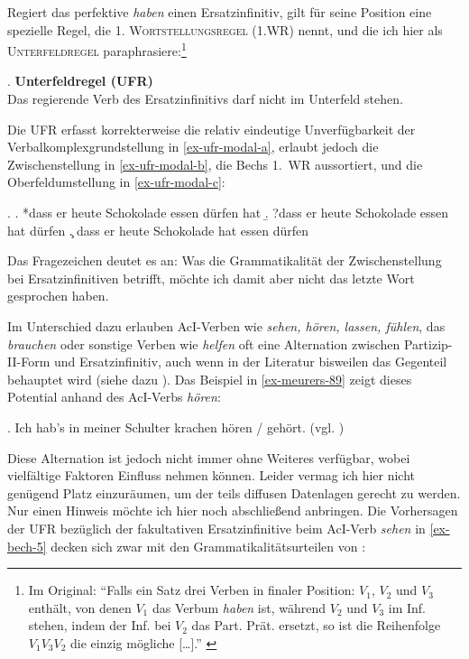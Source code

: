 Regiert das perfektive {\it haben} einen Ersatzinfinitiv, gilt für seine Position eine spezielle Regel, die \cite{Bech:63}  \textsc{1. Wortstellungsregel (1.WR)} nennt, und die ich hier als \textsc{Unterfeldregel} paraphrasiere:\footnote{Im Original: "`Falls ein Satz drei Verben in finaler Position: $V_1$, $V_2$ und $V_3$ enthält, von denen $V_1$ das Verbum {\it haben} ist, während $V_2$ und $V_3$ im Inf. stehen, indem der Inf. bei $V_2$ das Part. Prät. ersetzt, so ist die Reihenfolge $V_1 V_3 V_2$ die einzig mögliche [\ldots]."' \cite[\S 10]{Bech:63}} 

\ex. {\bf Unterfeldregel (UFR)} \label{ex-ufr}\\
Das regierende Verb des Ersatzinfinitivs darf nicht im Unterfeld stehen.

Die UFR erfasst korrekterweise die relativ eindeutige Unverfügbarkeit der Verbalkomplexgrundstellung in \ref{ex-ufr-modal-a}, erlaubt jedoch die Zwischenstellung in \ref{ex-ufr-modal-b}, die Bechs 1.~WR aussortiert, und die Oberfeldumstellung in \ref{ex-ufr-modal-c}:

\ex. 
\a. *dass er heute Schokolade essen dürfen hat \label{ex-ufr-modal-a}
\b. ?dass er heute Schokolade essen hat dürfen \label{ex-ufr-modal-b}
\c. dass er heute Schokolade hat essen dürfen \label{ex-ufr-modal-c}

Das Fragezeichen deutet es an: Was die Grammatikalität der Zwischenstellung bei Ersatzinfinitiven betrifft, möchte ich damit aber nicht das letzte Wort gesprochen haben.

Im Unterschied dazu erlauben AcI-Verben wie {\it sehen, hören, lassen, fühlen}, das  {\it brauchen} oder sonstige Verben wie {\it helfen} oft eine Alternation zwischen Partizip-II-Form und Ersatzinfinitiv, auch wenn in der Literatur bisweilen das Gegenteil behauptet wird (siehe dazu \citealt[55ff]{Meurers:99}). Das Beispiel in \ref{ex-meurers-89} zeigt dieses Potential anhand des AcI-Verbs {\it hören}: 

\ex. Ich hab's in meiner Schulter krachen hören / gehört. \hfill (vgl. \citealt[(89a)]{Meurers:99})\label{ex-meurers-89}

Diese Alternation ist jedoch nicht immer ohne Weiteres verfügbar, wobei vielfältige Faktoren Einfluss nehmen können. Leider vermag ich hier nicht genügend Platz einzuräumen, um der teils diffusen Datenlagen gerecht zu werden. Nur einen Hinweis möchte ich hier noch abschlie\ss end anbringen. Die Vorhersagen der UFR bezüglich der fakultativen Ersatzinfinitive beim AcI-Verb {\it sehen} in \ref{ex-bech-5}  decken sich zwar mit den Grammatikalitätsurteilen von \cite{Bech:63}:

